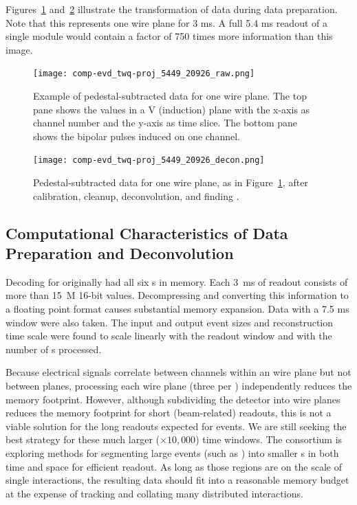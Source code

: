 Figures~\ref{fig:ch-exec-comp-chtraw} and~\ref{fig:ch-exec-comp-chtroi} illustrate the transformation of  data  during data preparation. Note that this represents one wire plane for 3 ms.  A full 5.4 ms readout of a single \nominalmodsize module would contain a factor of 750 times %
more information than this image.

\begin{figure}[t]
\texttt{[image: comp-evd\_twq-proj\_5449\_20926\_raw.png]}
\caption[Example of pedestal-subtracted data for one of the ProtoDUNE-SP  wire planes]{Example of pedestal-subtracted data for one   wire plane.  The top pane shows the  values in a V (induction) plane with the x-axis as channel number and the y-axis as time slice. The bottom pane shows the bipolar pulses induced on one channel. 
}
\label{fig:ch-exec-comp-chtraw}
\end{figure}


\begin{figure}[t]
 \texttt{[image: comp-evd\_twq-proj\_5449\_20926\_decon.png]}
\caption[Pedestal-subtracted data for one of the ProtoDUNE-SP  wire planes, additional processing]{
Pedestal-subtracted data for one  wire plane, as in Figure~\ref{fig:ch-exec-comp-chtraw}, after calibration, cleanup, deconvolution, and finding . 
}
\label{fig:ch-exec-comp-chtroi}
\end{figure}


\subsection{Computational Characteristics of Data Preparation and Deconvolution }

Decoding for  originally had all six s in memory. Each \SI{3}{ms} of  readout consists of more than \SI{15}{M} 16-bit values. Decompressing and converting this information to a floating point format causes substantial memory expansion. 
  Data with a 7.5 ms window were also taken. 
The input and output event sizes and reconstruction time scale were found to scale linearly with the readout window and with the number of s processed. 


Because electrical signals correlate between channels within an  wire plane but not between planes, processing each wire plane (three per ) independently reduces the memory footprint.
However,  although subdividing the detector into wire planes reduces the memory footprint for short (beam-related) readouts, this is  not a viable solution for the long readouts expected for  events. We are still seeking the best strategy for these much larger ($\times 10,000$) time windows. 
The  consortium is exploring methods for segmenting large events (such as ) into  smaller s in both time and space for efficient readout.  As long as those regions are on the scale of single interactions, the resulting data should fit into a reasonable memory budget at the expense of tracking and collating many distributed interactions. 

